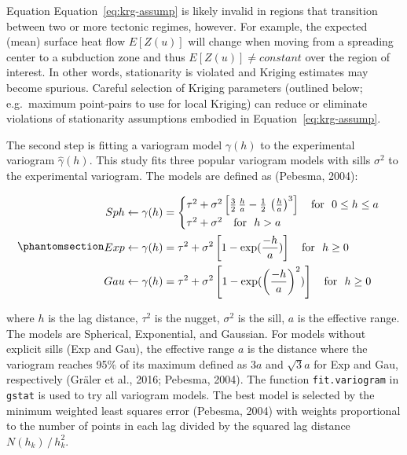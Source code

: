 \documentclass[final]{agujournal2019}
\begin{document}
Equation Equation~\ref{eq:krg-assump} is likely invalid in regions that
transition between two or more tectonic regimes, however. For example,
the expected (mean) surface heat flow \(E[Z(u)]\) will change when
moving from a spreading center to a subduction zone and thus
\(E[Z(u)] \neq constant\) over the region of interest. In other words,
stationarity is violated and Kriging estimates may become spurious.
Careful selection of Kriging parameters (outlined below; e.g.~maximum
point-pairs to use for local Kriging) can reduce or eliminate violations
of stationarity assumptions embodied in Equation~\ref{eq:krg-assump}.

The second step is fitting a variogram model \(\gamma(h)\) to the
experimental variogram \(\hat{\gamma}(h)\). This study fits three
popular variogram models with sills \(\sigma^2\) to the experimental
variogram. The models are defined as (Pebesma, 2004):

\begin{equation}\protect\phantomsection\label{eq:vgrm-mods}{
  \begin{aligned}
    Sph &\leftarrow \gamma(h) =
    \begin{cases}
      \tau^2 + \sigma^2 \left[ \frac{3}{2}\, \frac{h}{a} - \frac{1}{2}\, \left( \frac{h}{a} \right)^3 \right] \quad \text{for } \  0 \leq h \leq a \\
      \tau^2 + \sigma^2 \quad \text{for } \  h > a
    \end{cases} \\
    Exp &\leftarrow \gamma(h) = \tau^2 + \sigma^2 \left[ 1 - \exp(\frac{-h}{a}) \right] \quad \text{for } \  h \geq 0 \\
    Gau &\leftarrow \gamma(h) = \tau^2 + \sigma^2 \left[ 1 - \exp(\left(\frac{-h}{a}\right)^2) \right] \quad \text{for } \  h \geq 0 \\
  \end{aligned}
}\end{equation}

where \(h\) is the lag distance, \(\tau^2\) is the nugget, \(\sigma^2\)
is the sill, \(a\) is the effective range. The models are Spherical,
Exponential, and Gaussian. For models without explicit sills (Exp and
Gau), the effective range \(a\) is the distance where the variogram
reaches 95\% of its maximum defined as 3\(a\) and \(\sqrt{3}a\) for Exp
and Gau, respectively (Gräler et al., 2016; Pebesma, 2004). The function
\texttt{fit.variogram} in \texttt{gstat} is used to try all variogram
models. The best model is selected by the minimum weighted least squares
error (Pebesma, 2004) with weights proportional to the number of points
in each lag divided by the squared lag distance \(N(h_k)\, /\, h_k^2\).
\end{document}
